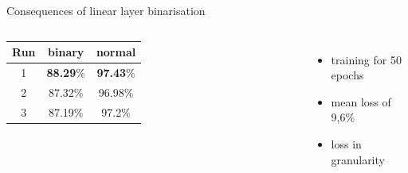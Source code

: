 \documentclass[aspectratio=1610, 12pt]{beamer}
\begin{document}
\begin{frame}{Consequences of linear layer binarisation}


	\begin{columns}
		\centering
		\begin{tabular}{|c|c|c|}\hline
			Run & binary           & normal           \\\hline
			1   & \textbf{88.29}\% & \textbf{97.43}\% \\\hline
			2   & 87.32\%          & 96.98\%          \\\hline
			3   & 87.19\%          & 97.2\%           \\\hline
		\end{tabular}
		\begin{itemize}
			\item training for 50 epochs
			\item mean loss of 9,6\%
			\item loss in granularity
		\end{itemize}

	\end{columns}


\end{frame}
\end{document}
